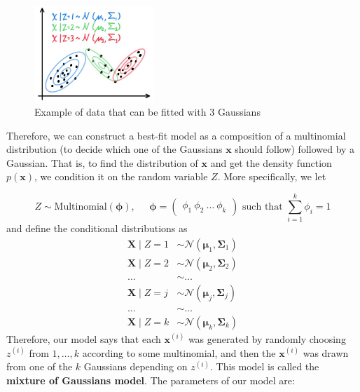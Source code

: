 \documentclass{article}
\begin{document}
      \begin{figure}[H]
        \centering
        \includegraphics[width=0.4\textwidth]{img/mixture_of_gaussians_example.jpg}
        \caption{Example of data that can be fitted with 3 Gaussians}
      \end{figure}

      Therefore, we can construct a best-fit model as a composition of a multinomial distribution (to decide which one of the Gaussians $\mathbf{x}$ should follow) followed by a Gaussian. That is, to find the distribution of $\mathbf{x}$ and get the density function $p(\mathbf{x})$, we condition it on the random variable $Z$. More specifically, we let

      \[Z \sim \text{Multinomial}(\boldsymbol{\phi}), \;\;\;\;\; \boldsymbol{\phi} = \begin{pmatrix} \phi_1 \ \phi_2 \ \ldots \ \phi_k \end{pmatrix} \text{ such that } \sum_{i=1}^k \phi_i = 1\]
      and define the conditional distributions as
      \begin{align*}
        \mathbf{X} \mid Z = 1 & \sim \mathcal{N}(\boldsymbol{\mu}_1, \boldsymbol{\Sigma}_1) \\
        \mathbf{X} \mid Z = 2 & \sim \mathcal{N}(\boldsymbol{\mu}_2, \boldsymbol{\Sigma}_2) \\
        \ldots & \sim \ldots \\
        \mathbf{X} \mid Z = j & \sim \mathcal{N}(\boldsymbol{\mu}_j, \boldsymbol{\Sigma}_j) \\
        \ldots & \sim \ldots \\
        \mathbf{X} \mid Z = k & \sim \mathcal{N}(\boldsymbol{\mu}_k, \boldsymbol{\Sigma}_k)
      \end{align*}
      Therefore, our model says that each $\mathbf{x}^{(i)}$ was generated by randomly choosing $z^{(i)}$ from ${1, \ldots, k}$ according to some multinomial, and then the $\mathbf{x}^{(i)}$ was drawn from one of the $k$ Gaussians depending on $z^{(i)}$. This model is called the \textbf{mixture of Gaussians model}. The parameters of our model are: 
\end{document}
